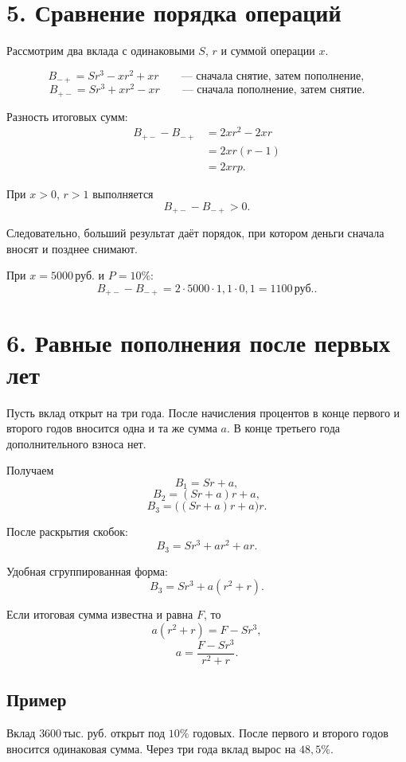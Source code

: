 \documentclass[a4paper,12pt]{article}
\newcommand{\rub}{\,\text{руб.}}
\newcommand{\thrub}{\,\text{тыс. руб.}}
\begin{document}
\section*{5. Сравнение порядка операций}

Рассмотрим два вклада с одинаковыми \(S\), \(r\) и суммой операции
\(x\).

\[
  B_{-+}
  =
  Sr^3-xr^2+xr
  \qquad
  \text{--- сначала снятие, затем пополнение},
\]
\[
  B_{+-}
  =
  Sr^3+xr^2-xr
  \qquad
  \text{--- сначала пополнение, затем снятие}.
\]

Разность итоговых сумм:
\[
  \begin{aligned}
    B_{+-}-B_{-+}
    &=
    2xr^2-2xr
    \\
    &=
    2xr(r-1)
    \\
    &=
    2xrp.
  \end{aligned}
\]

При \(x>0\), \(r>1\) выполняется
\[
  B_{+-}-B_{-+}>0.
\]

Следовательно, больший результат даёт порядок, при котором деньги
сначала вносят и позднее снимают.

При \(x=5000\rub\) и \(P=10\%\):
\[
  B_{+-}-B_{-+}
  =
  2\cdot5000\cdot1{,}1\cdot0{,}1
  =
  \boxed{1100\rub}.
\]

\section*{6. Равные пополнения после первых лет}

Пусть вклад открыт на три года. После начисления процентов в конце
первого и второго годов вносится одна и та же сумма \(a\).
В конце третьего года дополнительного взноса нет.

Получаем
\[
  B_1=Sr+a,
\]
\[
  B_2=(Sr+a)r+a,
\]
\[
  B_3=\bigl((Sr+a)r+a\bigr)r.
\]

После раскрытия скобок:
\[
  \boxed{
    B_3=Sr^3+ar^2+ar
  }.
\]

Удобная сгруппированная форма:
\[
  B_3=Sr^3+a(r^2+r).
\]

Если итоговая сумма известна и равна \(F\), то
\[
  a(r^2+r)=F-Sr^3,
\]
\[
  \boxed{
    a=\frac{F-Sr^3}{r^2+r}
  }.
\]

\subsection*{Пример}

Вклад \(3600\thrub\) открыт под \(10\%\) годовых. После первого
и второго годов вносится одинаковая сумма. Через три года вклад вырос
на \(48{,}5\%\).
\end{document}
